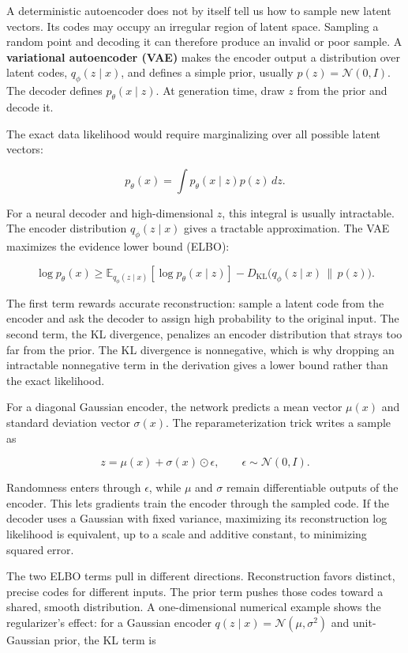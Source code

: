 A deterministic autoencoder does not by itself tell us how to sample new latent vectors. Its codes may occupy an irregular region of latent space. Sampling a random point and decoding it can therefore produce an invalid or poor sample. A \textbf{variational autoencoder (VAE)} makes the encoder output a distribution over latent codes, \(q_\phi(z\mid x)\), and defines a simple prior, usually \(p(z)=\mathcal{N}(0,I)\). The decoder defines \(p_\theta(x\mid z)\). At generation time, draw \(z\) from the prior and decode it.

The exact data likelihood would require marginalizing over all possible latent vectors:

\[
p_\theta(x)=\int p_\theta(x\mid z)p(z)\,dz.
\]

For a neural decoder and high-dimensional \(z\), this integral is usually intractable. The encoder distribution \(q_\phi(z\mid x)\) gives a tractable approximation. The VAE maximizes the evidence lower bound (ELBO):

\[
\log p_\theta(x)\geq
\mathbb{E}_{q_\phi(z\mid x)}[\log p_\theta(x\mid z)]
- D_{\mathrm{KL}}\big(q_\phi(z\mid x)\,\|\,p(z)\big).
\]

The first term rewards accurate reconstruction: sample a latent code from the encoder and ask the decoder to assign high probability to the original input. The second term, the KL divergence, penalizes an encoder distribution that strays too far from the prior. The KL divergence is nonnegative, which is why dropping an intractable nonnegative term in the derivation gives a lower bound rather than the exact likelihood.

For a diagonal Gaussian encoder, the network predicts a mean vector \(\mu(x)\) and standard deviation vector \(\sigma(x)\). The reparameterization trick writes a sample as

\[
z=\mu(x)+\sigma(x)\odot\epsilon,\qquad \epsilon\sim\mathcal{N}(0,I).
\]

Randomness enters through \(\epsilon\), while \(\mu\) and \(\sigma\) remain differentiable outputs of the encoder. This lets gradients train the encoder through the sampled code. If the decoder uses a Gaussian with fixed variance, maximizing its reconstruction log likelihood is equivalent, up to a scale and additive constant, to minimizing squared error.

The two ELBO terms pull in different directions. Reconstruction favors distinct, precise codes for different inputs. The prior term pushes those codes toward a shared, smooth distribution. A one-dimensional numerical example shows the regularizer's effect: for a Gaussian encoder \(q(z\mid x)=\mathcal{N}(\mu,\sigma^2)\) and unit-Gaussian prior, the KL term is

